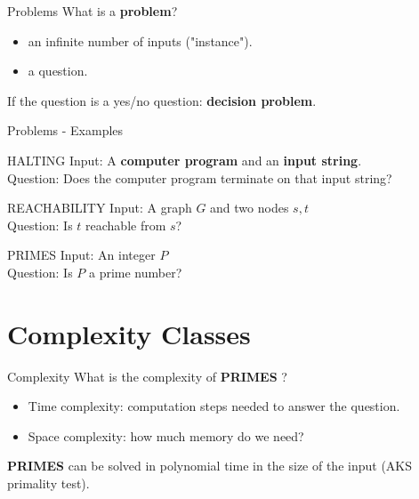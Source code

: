 \documentclass[c]{beamer}
\begin{document}
\begin{frame}{Problems}
        What is a \textbf{problem}?
         \begin{itemize}
			\item an infinite number of inputs ("instance").
			\item a question.
		\end{itemize}	 
		
		If the question is a yes/no question: \textbf{decision problem}. 		
	
\end{frame}

\begin{frame}{Problems - Examples}
    \begin{block}{ HALTING }
		Input: A \textbf{computer program} and an \textbf{input string}.\\
		Question: Does the computer program terminate on that input string?
    \end{block}	
	
	\begin{block}{ REACHABILITY }
		Input: A graph $G$ and two nodes $s,t$\\
		Question: Is $t$ reachable from $s$?
    \end{block}	
    
    \begin{block}{ PRIMES }
		Input: An integer $P$\\
		Question: Is $P$ a prime number?
    \end{block}	
    
\end{frame}

\section{Complexity Classes}
\begin{frame}{Complexity}
      What is the complexity of \textbf{PRIMES} ?
	 \begin{itemize}
			\item Time complexity: computation steps needed to answer the question.
			\item Space complexity: how much memory do we need?
	 \end{itemize}
	 
	 \textbf{PRIMES} can be solved in polynomial time in the size of the input (AKS primality test).
	 
\end{frame}
\end{document}
